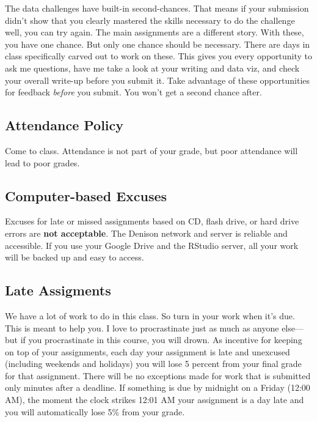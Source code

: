 \documentclass[11pt,]{article}
\begin{document}
The data challenges have built-in second-chances. That means if your
submission didn't show that you clearly mastered the skills necessary to
do the challenge well, you can try again. The main assignments are a
different story. With these, you have one chance. But only one chance
should be necessary. There are days in class specifically carved out to
work on these. This gives you every opportunity to ask me questions,
have me take a look at your writing and data viz, and check your overall
write-up before you submit it. Take advantage of these opportunities for
feedback \emph{before} you submit. You won't get a second chance after.

\hypertarget{attendance-policy}{%
\subsection{Attendance Policy}\label{attendance-policy}}

Come to class. Attendance is not part of your grade, but poor attendance
will lead to poor grades.

\hypertarget{computer-based-excuses}{%
\subsection{Computer-based Excuses}\label{computer-based-excuses}}

Excuses for late or missed assignments based on CD, flash drive, or hard
drive errors are \textbf{not acceptable}. The Denison network and server
is reliable and accessible. If you use your Google Drive and the RStudio
server, all your work will be backed up and easy to access.

\hypertarget{late-assigments}{%
\subsection{Late Assigments}\label{late-assigments}}

We have a lot of work to do in this class. So turn in your work when
it's due. This is meant to help you. I love to procrastinate just as
much as anyone else---but if you procrastinate in this course, you will
drown. As incentive for keeping on top of your assignments, each day
your assignment is late and unexcused (including weekends and holidays)
you will lose 5 percent from your final grade for that assignment. There
will be no exceptions made for work that is submitted only minutes after
a deadline. If something is due by midnight on a Friday (12:00 AM), the
moment the clock strikes 12:01 AM your assignment is a day late and you
will automatically lose 5\% from your grade.
\end{document}
